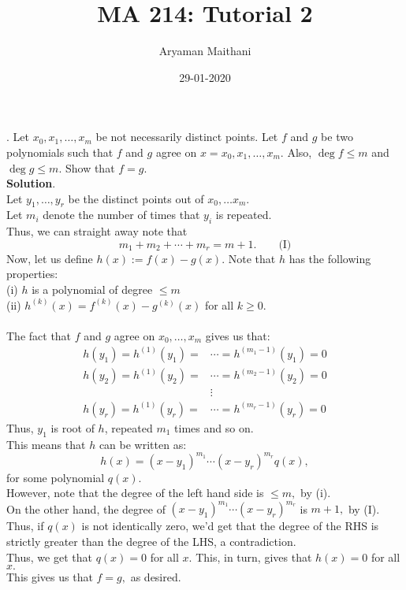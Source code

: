 \documentclass{article}
\title{MA 214: Tutorial 2}
\author{Aryaman Maithani}
\date{29-01-2020}
\begin{document}
. Let $x_0, x_1, \ldots, x_m$ be not necessarily distinct points. Let $f$ and $g$ be two polynomials such that $f$ and $g$ agree on $x = x_0, x_1, \ldots, x_m.$ Also, $\deg f \le m$ and $\deg g \le m.$ Show that $f = g.$\\

\textbf{Solution}.\\
Let $y_1, \ldots, y_r$ be the distinct points out of $x_0, \ldots x_m.$\\
Let $m_i$ denote the number of times that $y_i$ is repeated.\\
Thus, we can straight away note that
\[m_1 + m_2 + \cdots + m_r = m+1. \qquad \text{(I)}\]
Now, let us define $h(x) := f(x) - g(x).$ Note that $h$ has the following properties:\\
(i) $h$ is a polynomial of degree $\le m$\\
(ii) $h^{(k)}(x) = f^{(k)}(x) - g^{(k)}(x)$ for all $k \ge 0.$\\~\\
The fact that $f$ and $g$ agree on $x_0, \ldots, x_m$ gives us that:\\
\begin{align*} 
	h(y_1) = h^{(1)}(y_1) = &\cdots = h^{(m_1 - 1)}(y_1) = 0\\
	h(y_2) = h^{(1)}(y_2) = &\cdots = h^{(m_2 - 1)}(y_2) = 0\\
	&\vdots\\
	h(y_r) = h^{(1)}(y_r) = &\cdots = h^{(m_r - 1)}(y_r) = 0	
\end{align*}
Thus, $y_1$ is root of $h$, repeated $m_1$ times and so on.\\
This means that $h$ can be written as:
\[h(x) = (x - y_1)^{m_1}\cdots(x - y_r)^{m_r}q(x),\]
for some polynomial $q(x).$\\
However, note that the degree of the left hand side is $\le m,$ by (i).\\
On the other hand, the degree of $(x - y_1)^{m_1}\cdots(x - y_r)^{m_r}$ is $m+1,$ by (I).\\
Thus, if $q(x)$ is not identically zero, we'd get that the degree of the RHS is strictly greater than the degree of the LHS, a contradiction.\\
Thus, we get that $q(x) = 0$ for all $x.$ This, in turn, gives that $h(x) = 0$ for all $x.$\\
This gives us that $f = g,$ as desired.
\end{document}
